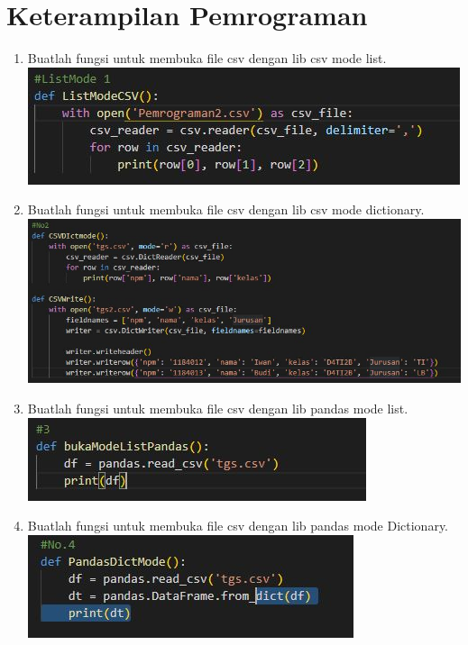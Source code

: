 \section{Keterampilan Pemrograman}
\begin{enumerate}

\item Buatlah fungsi untuk membuka file csv dengan lib csv mode list.\\ %
\includegraphics{gambar/csv7.jpg}

\item Buatlah fungsi untuk membuka file csv dengan lib csv mode dictionary.\\ %
\includegraphics[scale = 0.7]{gambar/csv8.jpg}

\item Buatlah fungsi untuk membuka file csv dengan lib pandas mode list.\\ %
\includegraphics{gambar/csv9.jpg}

\item Buatlah fungsi untuk membuka file csv dengan lib pandas mode Dictionary.\\ %
\includegraphics{gambar/csv10.jpg}


\end{enumerate}

